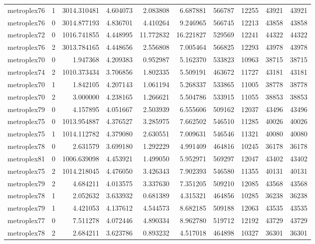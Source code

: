 \begin{longtable}{|l|r|r|r|r|r|r|r|r|r|}
metroplex76 & 1 & 3014.310481 & 4.604073 & 2.083808 & 6.687881 & 566787 & 12255 & 43921 & 43921 \\
metroplex76 & 0 & 3014.877193 & 4.836701 & 4.410264 & 9.246965 & 566745 & 12213 & 43858 & 43858 \\
metroplex72 & 0 & 1016.741855 & 4.448995 & 11.772832 & 16.221827 & 529569 & 12241 & 44322 & 44322 \\
metroplex76 & 2 & 3013.784165 & 4.448656 & 2.556808 & 7.005464 & 566825 & 12293 & 43978 & 43978 \\
metroplex70 & 0 & 1.947368 & 4.209383 & 0.952987 & 5.162370 & 533823 & 10963 & 38715 & 38715 \\
metroplex74 & 2 & 1010.373434 & 3.706856 & 1.802335 & 5.509191 & 463672 & 11727 & 43181 & 43181 \\
metroplex70 & 1 & 1.842105 & 4.207143 & 1.061194 & 5.268337 & 533865 & 11005 & 38778 & 38778 \\
metroplex70 & 2 & 3.000000 & 4.238165 & 1.266621 & 5.504786 & 533915 & 11055 & 38853 & 38853 \\
metroplex79 & 0 & 4.157895 & 4.051667 & 2.503939 & 6.555606 & 509162 & 12037 & 43496 & 43496 \\
metroplex75 & 0 & 1013.954887 & 4.376527 & 3.285975 & 7.662502 & 546510 & 11285 & 40026 & 40026 \\
metroplex75 & 1 & 1014.112782 & 4.379080 & 2.630551 & 7.009631 & 546546 & 11321 & 40080 & 40080 \\
metroplex78 & 0 & 2.631579 & 3.699180 & 1.292229 & 4.991409 & 464816 & 10245 & 36178 & 36178 \\
metroplex81 & 0 & 1006.639098 & 4.453921 & 1.499050 & 5.952971 & 569297 & 12047 & 43402 & 43402 \\
metroplex75 & 2 & 1014.218045 & 4.476050 & 3.426343 & 7.902393 & 546580 & 11355 & 40131 & 40131 \\
metroplex79 & 2 & 4.684211 & 4.013575 & 3.337630 & 7.351205 & 509210 & 12085 & 43568 & 43568 \\
metroplex78 & 1 & 2.052632 & 3.633932 & 0.681389 & 4.315321 & 464856 & 10285 & 36238 & 36238 \\
metroplex79 & 1 & 4.421053 & 4.137612 & 4.544573 & 8.682185 & 509188 & 12063 & 43535 & 43535 \\
metroplex77 & 0 & 7.511278 & 4.072446 & 4.890334 & 8.962780 & 519712 & 12192 & 43729 & 43729 \\
metroplex78 & 2 & 2.684211 & 3.623786 & 0.893232 & 4.517018 & 464898 & 10327 & 36301 & 36301 \\

\end{longtable}

